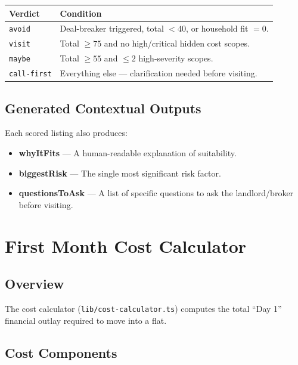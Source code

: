 \documentclass[12pt, a4paper, oneside]{report}
\newcommand{\filepath}[1]{\texttt{\small\color{codeblue}#1}}
\begin{document}
\begin{longtable}{p{3cm} p{10cm}}
\toprule
\textbf{Verdict} & \textbf{Condition} \\
\midrule
\endhead
\texttt{avoid} & Deal-breaker triggered, total $< 40$, or household fit $= 0$. \\
\texttt{visit} & Total $\geq 75$ and no high/critical hidden cost scopes. \\
\texttt{maybe} & Total $\geq 55$ and $\leq 2$ high-severity scopes. \\
\texttt{call-first} & Everything else --- clarification needed before visiting. \\
\bottomrule
\end{longtable}

\section{Generated Contextual Outputs}

Each scored listing also produces:

\begin{itemize}[leftmargin=2em]
  \item \textbf{whyItFits} --- A human-readable explanation of suitability.
  \item \textbf{biggestRisk} --- The single most significant risk factor.
  \item \textbf{questionsToAsk} --- A list of specific questions to ask the landlord/broker before visiting.
\end{itemize}


\chapter{First Month Cost Calculator}

\section{Overview}

The cost calculator (\filepath{lib/cost-calculator.ts}) computes the total ``Day 1'' financial outlay required to move into a flat.

\section{Cost Components}
\end{document}
